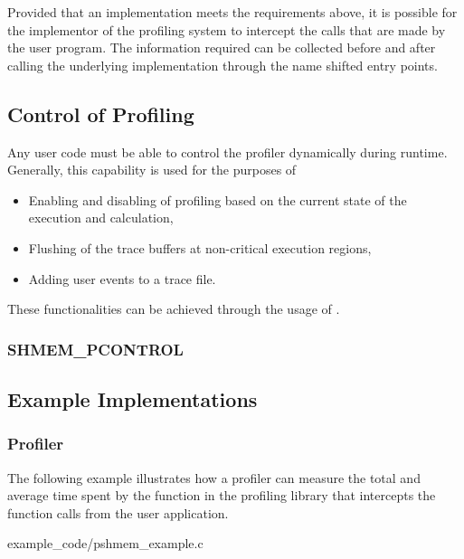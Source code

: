 Provided that an \openshmem implementation meets the requirements 
above, it is possible for the implementor of the profiling system 
to intercept the \openshmem calls that are made by the user 
program. The information required can be collected before and after 
calling the underlying \openshmem implementation through the name 
shifted entry points. 

\subsection{Control of Profiling}
\label{sec:pshmem_control_profile}
Any user code must be able to control the profiler dynamically 
during runtime. Generally, this capability is used for the 
purposes of

\begin{itemize}
\item Enabling and disabling of profiling based on the current 
state of the execution and calculation,
\item Flushing of the trace buffers at non-critical execution 
regions,
\item Adding user events to a trace file.
\end{itemize}

These functionalities can be achieved through the usage of 
.

\subsubsection{\textbf{SHMEM\_PCONTROL}}\label{subsec:shmem_pcontrol}




\subsection{Example Implementations}
\label{sec:pshmem_example_implementations}

\subsubsection{Profiler}
\label{sec:pshmem_example_profiler}

The following example illustrates how a profiler can measure the
total and average time spent by the  
function in the profiling library that intercepts the \openshmem 
function calls from the user application.


      {example_code/pshmem_example.c}

